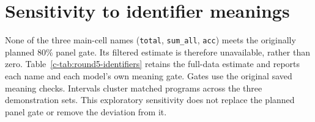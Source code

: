 \section{Sensitivity to identifier meanings}
\label{c-app:round5-identifiers}
None of the three main-cell names (\texttt{total}, \texttt{sum\_all}, \texttt{acc}) meets the originally planned 80\% panel gate. Its filtered estimate is therefore unavailable, rather than zero.
Table~\ref{c-tab:round5-identifiers} retains the full-data estimate and reports each name and each model's own meaning gate. Gates use the original saved meaning checks. Intervals cluster matched programs across the three demonstration sets. This exploratory sensitivity does not replace the planned panel gate or remove the deviation from it.
\begin{table}[t]
\centering\small
{}
\ifdim\wd\roundfivebox>\textwidth\resizebox{\textwidth}{!}{\usebox{\roundfivebox}}\else\usebox{\roundfivebox}\fi
\caption{Excess name errors in percentage points [95\% interval], level 5 length-to-sum. Empty subsets are shown as dashes. The saved JSON also reports each demonstration set and the all-three-sets sign rule.}
\label{c-tab:round5-identifiers}
\end{table}
